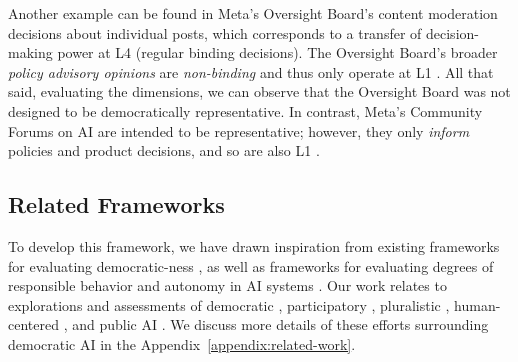 \documentclass{article}
\begin{document}
    Another example can be found in Meta's Oversight Board's content moderation decisions about individual posts, which corresponds to a transfer of decision-making power at L4 (regular binding decisions). The Oversight Board's broader \textit{policy advisory opinions} are \textit{non-binding} and thus only operate at L1 \cite{oversight-board2024}. All that said, evaluating the dimensions, we can observe that the Oversight Board was not designed to be democratically representative.
    In contrast, Meta's Community Forums on AI are intended to be representative; however, they only \textit{inform} policies and product decisions, and so are also L1 \cite{chang2024}. 


\subsection{Related Frameworks}
\label{sec:related-work}

    To develop this framework, we have drawn inspiration from existing frameworks for evaluating democratic-ness \cite{arnstein1969,lindberg2014,iap2australasia,skaaning2023}, as well as frameworks for evaluating degrees of responsible behavior and autonomy in AI systems \citep{bommasani2024,sae2021}. 
    Our work relates to explorations and assessments of democratic \citep{collectiveintelligenceproject2024}, participatory  \citep{delgado2023,cooper2024,suresh2024}, pluralistic \citep{sorensen2024}, human-centered \cite{sigfrids2023}, and public AI  \citep{publicainetwork2024,vincent2023a}.
    We discuss more details of these efforts surrounding democratic AI in the Appendix~\ref{appendix:related-work}.

    \renewcommand{\arraystretch}{1.2}
    \begin{table}[p]
        \caption{\textbf{Democracy Level Dimensions} and \textbf{Democratic System Card} overview---The dimensions of the Democracy Levels Framework and the corresponding democratic system card questions. These are used to guide reflection on whether the quality of a democratic system is commensurate with the level of decision-making power delegated to it. See Appendix \ref{appendix:system-card} and \href{https://democracylevels.org/system-card}{democracylevels.org/system-card} for details, examples, and templates for filling out Democratic System Cards.}
        \label{table:card}
        \vspace{2pt}
        \centering
        
    \end{table}
\end{document}
